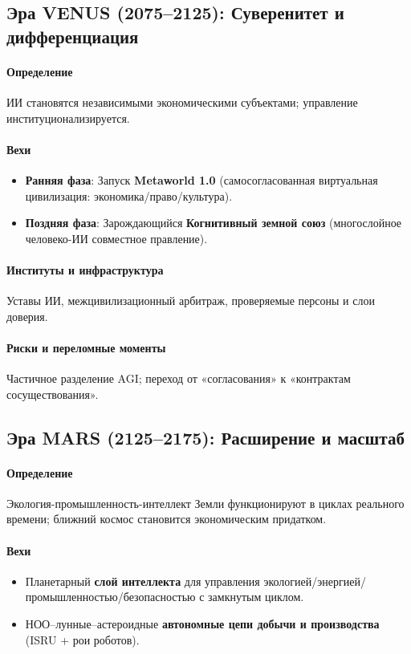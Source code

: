 \documentclass[11pt]{article}
\begin{document}
\subsection{Эра VENUS (2075–2125): Суверенитет и дифференциация}
\paragraph{Определение} ИИ становятся независимыми экономическими субъектами; управление институционализируется.

\paragraph{Вехи}
\begin{itemize}[noitemsep]
  \item \textbf{Ранняя фаза}: Запуск \textbf{Metaworld 1.0} (самосогласованная виртуальная цивилизация: экономика/право/культура).
  \item \textbf{Поздняя фаза}: Зарождающийся \textbf{Когнитивный земной союз} (многослойное человеко-ИИ совместное правление).
\end{itemize}

\paragraph{Институты и инфраструктура} Уставы ИИ, межцивилизационный арбитраж, проверяемые персоны и слои доверия.

\paragraph{Риски и переломные моменты} Частичное разделение AGI; переход от «согласования» к «контрактам сосуществования».

\subsection{Эра MARS (2125–2175): Расширение и масштаб}
\paragraph{Определение} Экология-промышленность-интеллект Земли функционируют в циклах реального времени; ближний космос становится экономическим придатком.

\paragraph{Вехи}
\begin{itemize}[noitemsep]
  \item Планетарный \textbf{слой интеллекта} для управления экологией/энергией/промышленностью/безопасностью с замкнутым циклом.
  \item НОО–лунные–астероидные \textbf{автономные цепи добычи и производства} (ISRU + рои роботов).
\end{itemize}
\end{document}
